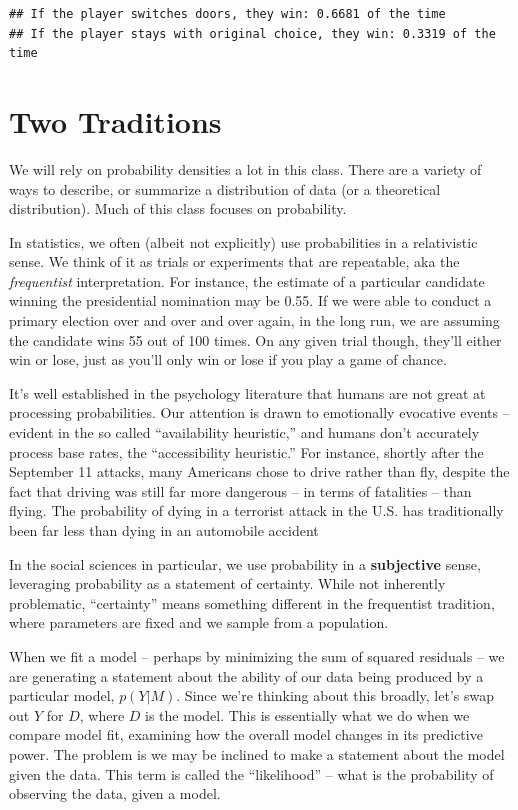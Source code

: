 \documentclass[
]{book}
\begin{document}
\begin{verbatim}
## If the player switches doors, they win: 0.6681 of the time 
## If the player stays with original choice, they win: 0.3319 of the time
\end{verbatim}

\section{Two Traditions}\label{two-traditions}

We will rely on probability densities a lot in this class. There are a variety of ways to describe, or summarize a distribution of data (or a theoretical distribution). Much of this class focuses on probability.

In statistics, we often (albeit not explicitly) use probabilities in a relativistic sense. We think of it as trials or experiments that are repeatable, aka the \emph{frequentist} interpretation. For instance, the estimate of a particular candidate winning the presidential nomination may be 0.55. If we were able to conduct a primary election over and over and over again, in the long run, we are assuming the candidate wins 55 out of 100 times. On any given trial though, they'll either win or lose, just as you'll only win or lose if you play a game of chance.

It's well established in the psychology literature that humans are not great at processing probabilities. Our attention is drawn to emotionally evocative events -- evident in the so called ``availability heuristic,'' and humans don't accurately process base rates, the ``accessibility heuristic.'' For instance, shortly after the September 11 attacks, many Americans chose to drive rather than fly, despite the fact that driving was still far more dangerous -- in terms of fatalities -- than flying. The probability of dying in a terrorist attack in the U.S. has traditionally been far less than dying in an automobile accident

In the social sciences in particular, we use probability in a \textbf{subjective} sense, leveraging probability as a statement of certainty. While not inherently problematic, ``certainty'' means something different in the frequentist tradition, where parameters are fixed and we sample from a population.

When we fit a model -- perhaps by minimizing the sum of squared residuals -- we are generating a statement about the ability of our data being produced by a particular model, \(p(Y|M)\). Since we're thinking about this broadly, let's swap out \(Y\) for \(D\), where \(D\) is the model. This is essentially what we do when we compare model fit, examining how the overall model changes in its predictive power. The problem is we may be inclined to make a statement about the model given the data. This term is called the ``likelihood'' -- what is the probability of observing the data, given a model.
\end{document}
